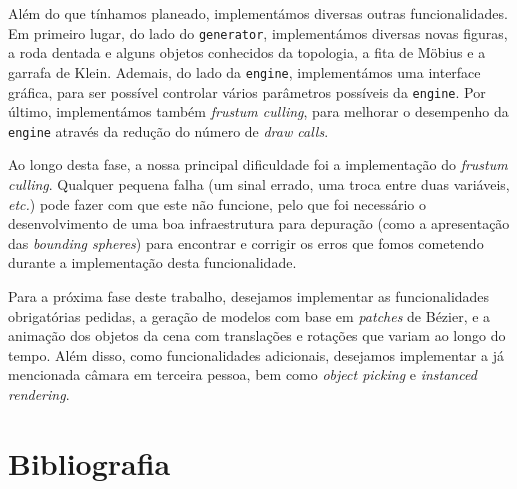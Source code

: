 \documentclass[12pt, a4paper]{article}
\begin{document}
Além do que tínhamos planeado, implementámos diversas outras funcionalidades. Em primeiro lugar, do
lado do \texttt{generator}, implementámos diversas novas figuras, a roda dentada e alguns objetos
conhecidos da topologia, a fita de Möbius e a garrafa de Klein. Ademais, do lado da
\texttt{engine}, implementámos uma interface gráfica, para ser possível controlar vários parâmetros
possíveis da \texttt{engine}. Por último, implementámos também \emph{frustum culling}, para melhorar
o desempenho da \texttt{engine} através da redução do número de \emph{draw calls}.

Ao longo desta fase, a nossa principal dificuldade foi a implementação do \emph{frustum culling}.
Qualquer pequena falha (um sinal errado, uma troca entre duas variáveis, \emph{etc.}) pode fazer
com que este não funcione, pelo que foi necessário o desenvolvimento de uma boa infraestrutura
para depuração (como a apresentação das \emph{bounding spheres}) para encontrar e corrigir os erros
que fomos cometendo durante a implementação desta funcionalidade.

Para a próxima fase deste trabalho, desejamos implementar as funcionalidades obrigatórias pedidas,
a geração de modelos com base em \emph{patches} de Bézier, e a animação dos objetos da cena com
translações e rotações que variam ao longo do tempo. Além disso, como funcionalidades adicionais,
desejamos implementar a já mencionada câmara em terceira pessoa, bem como \emph{object picking} e
\emph{instanced rendering}.

\begingroup
\section{Bibliografia}
\renewcommand{\section}[2]{}
\end{document}
